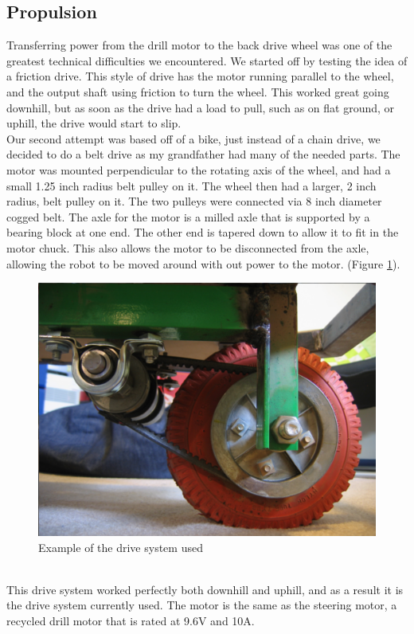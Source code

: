 \documentclass{article}
\begin{document}
\subsection{Propulsion}
Transferring power from the drill motor to the back drive wheel was one of the greatest technical difficulties we encountered. We started off by testing the idea of a friction drive. This style of drive has the motor running parallel to the wheel, and the output shaft using friction to turn the wheel. This worked great going downhill, but as soon as the drive had a load to pull, such as on flat ground, or uphill, the drive would start to slip.\\
Our second attempt was based off of a bike, just instead of a chain drive, we decided to do a belt drive as my grandfather had many of the needed parts. The motor was mounted perpendicular to the rotating axis of the wheel, and had a small 1.25 inch radius belt pulley on it. The wheel then had a larger, 2 inch radius, belt pulley on it. The two pulleys were connected via 8 inch diameter cogged belt. The axle for the motor is a milled axle that is supported by a bearing block at one end. The other end is tapered down to allow it to fit in the motor chuck. This also allows the motor to be disconnected from the axle, allowing the robot to be moved around with out power to the motor. (Figure \ref{reardrive}).
\begin{figure}[htp]
  \begin{center}
\includegraphics[scale=0.5]{reardrive}
  \end{center}
  \caption{Example of the drive system used}
\label{reardrive}
\end{figure}\\
This drive system worked perfectly both downhill and uphill, and as a result it is the drive system currently used. The motor is the same as the steering motor, a recycled drill motor that is rated at 9.6V and 10A.\\
\end{document}
